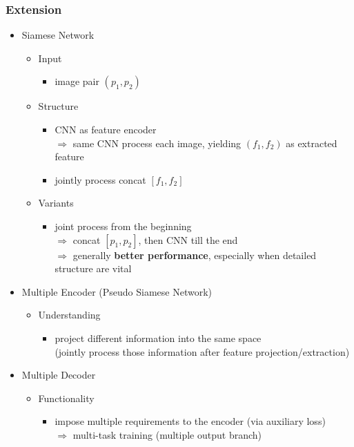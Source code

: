 \subsubsection{Extension}
\begin{itemize}
\item Siamese Network
	\begin{itemize}
	\item Input
		\begin{itemize}
		\item image pair $(p_1,p_2)$
		\end{itemize}
	\item Structure
		\begin{itemize}
		\item CNN as feature encoder \\
		$\Rightarrow$ same CNN process each image, yielding $(f_1, f_2)$ as extracted feature
		\item jointly process concat $[f_1,f_2]$
		\end{itemize}
	\item Variants
		\begin{itemize}
		\item joint process from the beginning \\
		$\Rightarrow$ concat $[p_1,p_2]$, then CNN till the end \\
		$\Rightarrow$ generally \textbf{better performance}, especially when detailed structure are vital
		\end{itemize}
	\end{itemize}

\item Multiple Encoder (Pseudo Siamese Network)
	\begin{itemize}
	\item Understanding
		\begin{itemize}
		\item project different information into the same space \\
		(jointly process those information after feature projection/extraction)
		\end{itemize}		
	\end{itemize}

\item Multiple Decoder
	\begin{itemize}
	\item Functionality
		\begin{itemize}
		\item impose multiple requirements to the encoder (via auxiliary loss) \\
		$\Rightarrow$ multi-task training (multiple output branch)
		\end{itemize}
	\end{itemize}
\end{itemize}

